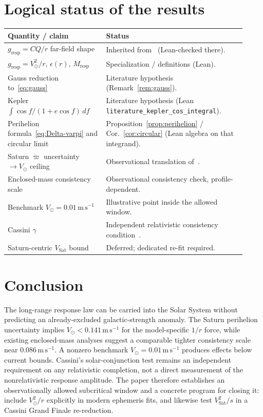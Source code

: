 \documentclass[11pt]{article}
\theoremstyle{definition}
\theoremstyle{remark}
\begin{document}
\section{Logical status of the results}
\label{sec:status}
\begin{center}
\small
\begin{tabular}{@{}p{0.38\linewidth}p{0.54\linewidth}@{}}
\toprule
\textbf{Quantity / claim} & \textbf{Status}\\
\midrule
$g_{\mathrm{resp}}=CQ/r$ far-field shape & Inherited from~\cite{boyd2026galactic} (Lean-checked there).\\
$g_{\mathrm{resp}}=V_\odot^{2}/r$, $\epsilon(r)$, $M_{\mathrm{resp}}$ & Specialization / definitions (Lean).\\
Gauss reduction to~\eqref{eq:gauss} & Literature hypothesis (Remark~\ref{rem:gauss}).\\
Kepler $\int\cos f/(1+e\cos f)\,df$ & Literature hypothesis (Lean \texttt{literature\_kepler\_cos\_integral}).\\
Perihelion formula~\eqref{eq:Delta-varpi} and circular limit & Proposition~\ref{prop:perihelion} / Cor.~\ref{cor:circular} (Lean algebra on that integrand).\\
Saturn $\dot\varpi$ uncertainty $\to V_\odot$ ceiling & Observational translation of~\cite{Pitjeva2013}.\\
Enclosed-mass consistency scale & Observational consistency check, profile-dependent.\\
Benchmark $V_\odot=0.01\,\mathrm{m\,s^{-1}}$ & Illustrative point inside the allowed window.\\
Cassini $\gamma$ & Independent relativistic consistency condition~\cite{Bertotti2003}.\\
Saturn-centric $V_{\mathrm{Sat}}$ bound & Deferred; dedicated re-fit required.\\
\bottomrule
\end{tabular}
\end{center}

\section{Conclusion}
\label{sec:conclusion}
The long-range response law can be carried into the Solar System without predicting an already-excluded galactic-strength anomaly.
The Saturn perihelion uncertainty implies $V_\odot<0.141\,\mathrm{m\,s^{-1}}$ for the model-specific $1/r$ force, while existing enclosed-mass analyses suggest a comparable tighter consistency scale near $0.086\,\mathrm{m\,s^{-1}}$.
A nonzero benchmark $V_\odot=0.01\,\mathrm{m\,s^{-1}}$ produces effects below current bounds.
Cassini's solar-conjunction test remains an independent requirement on any relativistic completion, not a direct measurement of the nonrelativistic response amplitude.
The paper therefore establishes an observationally allowed subcritical window and a concrete program for closing it: include $V_\odot^{2}/r$ explicitly in modern ephemeris fits, and likewise test $V_{\mathrm{Sat}}^{2}/s$ in a Cassini Grand Finale re-reduction.



\end{document}
